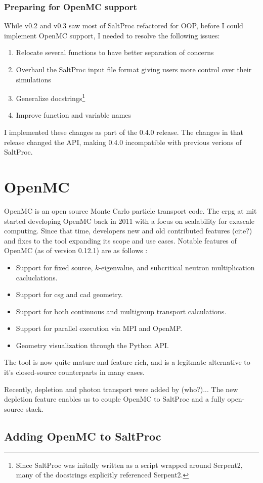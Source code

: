 \subsubsection{Preparing for OpenMC support}%
While v0.2 and v0.3 saw most of SaltProc refactored for OOP, before I could implement OpenMC support, I needed to resolve the following issues:
\begin{enumerate}
    \item Relocate several functions to have better separation of concerns
    \item Overhaul the SaltProc input file format giving users more control over their simulations
    \item Generalize docstrings\footnote{Since SaltProc was initally written as a script wrapped around Serpent2, many of the docstrings explicitly referenced Serpent2.}
    \item Improve function and variable names
\end{enumerate}
I implemented these changes as part of the 0.4.0 release. The changes in that release changed the API, making 0.4.0 incompatible with previous verions of SaltProc.

\section{OpenMC}%
\label{sub:openmc}

OpenMC \cite{romano_openmc_2015} is an open source Monte Carlo particle transport code. The \Gls{crpg} at \Gls{mit} started developing OpenMC back in 2011 with a focus on scalability for exascale computing. Since that time, developers new and old contributed features (cite?) and fixes to the tool expanding its scope and use cases. Notable features of OpenMC (as of version 0.12.1) are as follows \cite{homepage_openmc_2022}:
\begin{itemize}
    \item Support for fixed source, $k$-eigenvalue, and subcritical neutron multiplication cacluclations.
    \item Support for \Gls{csg} and \Gls{cad} geometry.
    \item Support for both continuous and multigroup transport calculations.
    \item Support for parallel execution via MPI and OpenMP.
    \item Geometry visualization through the Python API.
\end{itemize}
The tool is now quite mature and feature-rich, and is a legitmate alternative to it's closed-source counterparts in many cases.

Recently, depletion and photon transport were added by (who?)... The new depletion feature enables us to couple OpenMC to SaltProc and a fully open-source stack.

\subsection{Adding OpenMC to SaltProc}%
\label{sub:adding_openmc_to_saltproc}
